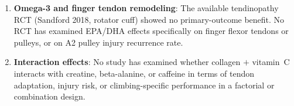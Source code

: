 \begin{enumerate}[noitemsep]
  \item \textbf{Omega-3 and finger tendon remodeling}: The available tendinopathy RCT (Sandford 2018, rotator cuff) showed no primary-outcome benefit. No RCT has examined EPA/DHA effects specifically on finger flexor tendons or pulleys, or on A2 pulley injury recurrence rate.

  \item \textbf{Interaction effects}: No study has examined whether collagen $+$ vitamin~C interacts with creatine, beta-alanine, or caffeine in terms of tendon adaptation, injury risk, or climbing-specific performance in a factorial or combination design.

\end{enumerate}
